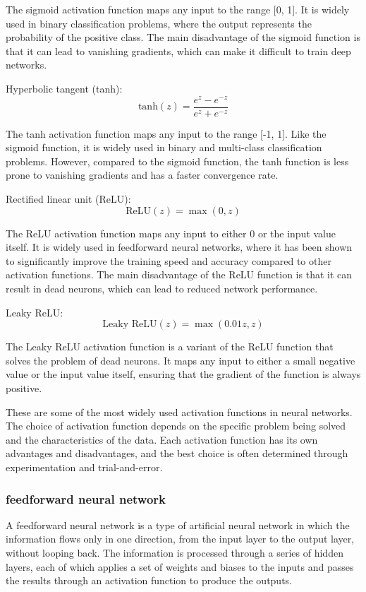 \documentclass[12pt, a4paper, oneside]{article}
\begin{document}
The sigmoid activation function maps any input to the range [0, 1]. It is widely used in binary classification problems, where the output represents the probability of the positive class. The main disadvantage of the sigmoid function is that it can lead to vanishing gradients, which can make it difficult to train deep networks.

Hyperbolic tangent (tanh):
$$ \text{tanh}(z) = \frac{e^z - e^{-z}}{e^z + e^{-z}} $$

The tanh activation function maps any input to the range [-1, 1]. Like the sigmoid function, it is widely used in binary and multi-class classification problems. However, compared to the sigmoid function, the tanh function is less prone to vanishing gradients and has a faster convergence rate.

Rectified linear unit (ReLU):
$$ \text{ReLU}(z) = \max(0, z) $$

The ReLU activation function maps any input to either 0 or the input value itself. It is widely used in feedforward neural networks, where it has been shown to significantly improve the training speed and accuracy compared to other activation functions. The main disadvantage of the ReLU function is that it can result in dead neurons, which can lead to reduced network performance.

Leaky ReLU:
$$ \text{Leaky ReLU}(z) = \max(0.01z, z) $$

The Leaky ReLU activation function is a variant of the ReLU function that solves the problem of dead neurons. It maps any input to either a small negative value or the input value itself, ensuring that the gradient of the function is always positive.

These are some of the most widely used activation functions in neural networks. The choice of activation function depends on the specific problem being solved and the characteristics of the data. Each activation function has its own advantages and disadvantages, and the best choice is often determined through experimentation and trial-and-error.
\subsubsection{feedforward neural network }
A feedforward neural network is a type of artificial neural network in which the information flows only in one direction, from the input layer to the output layer, without looping back. The information is processed through a series of hidden layers, each of which applies a set of weights and biases to the inputs and passes the results through an activation function to produce the outputs.
\end{document}
